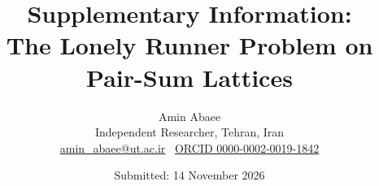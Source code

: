 \documentclass[11pt,a4paper]{article}
\begin{document}
\title{Supplementary Information:\\[4pt] The Lonely Runner Problem on Pair-Sum Lattices}
\author{Amin Abaee\\[2pt] {\small Independent Researcher, Tehran, Iran}\\[1pt] {\small \href{mailto:amin_abaee@ut.ac.ir}{amin\_abaee@ut.ac.ir} \textbullet\ \href{https://orcid.org/0000-0002-0019-1842}{ORCID 0000-0002-0019-1842}}}
\date{Submitted: 14 November 2026}
\date{}\maketitle
\tableofcontents
\clearpage



\end{document}
